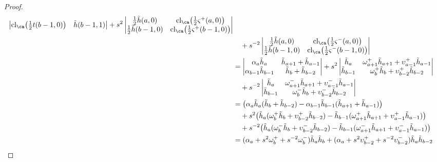 \begin{proof}
\begin{align*}
\begin{vmatrix}
\cl_\ca \big( \frac{1}{2} t(b-1,0) \big) & \tilde{h}(b-1,1)
\end{vmatrix}
+ s^2
\begin{vmatrix}
\frac{1}{2}\tilde{h}(a,0) & \cl_\ca \big( \frac{1}{2} \varsigma^+(a,0) \big) \\
\frac{1}{2}\tilde{h}(b-1,0) & \cl_\ca \big( \frac{1}{2} \varsigma^+(b-1,0) \big)
\end{vmatrix} \\
& \quad + s^{-2}
\begin{vmatrix}
\frac{1}{2}\tilde{h}(a,0) & \cl_\ca \big( \frac{1}{2} \varsigma^-(a,0) \big) \\
\frac{1}{2}\tilde{h}(b-1,0) & \cl_\ca \big( \frac{1}{2} \varsigma^-(b-1,0) \big)
\end{vmatrix} \\
&=
\begin{vmatrix}
\alpha_a \tilde{h}_a & \tilde{h}_{a+1} + \tilde{h}_{a-1} \\
\alpha_{b-1} \tilde{h}_{b-1} & \tilde{h}_{b} + \tilde{h}_{b-2}
\end{vmatrix}
+ s^2
\begin{vmatrix}
\tilde{h}_a & \omega_{a+1}^+ \tilde{h}_{a+1} + \upsilon^+_{a-1} \tilde{h}_{a-1} \\
\tilde{h}_{b-1} & \omega_{b}^+ \tilde{h}_{b} + \upsilon^+_{b-2} \tilde{h}_{b-2}
\end{vmatrix} \\
& \quad + s^{-2}
\begin{vmatrix}
\tilde{h}_a & \omega_{a+1}^- \tilde{h}_{a+1} + \upsilon^-_{a-1} \tilde{h}_{a-1} \\
\tilde{h}_{b-1} & \omega_{b}^- \tilde{h}_{b} + \upsilon^-_{b-2} \tilde{h}_{b-2}
\end{vmatrix} \\
&= \big( \alpha_a \tilde{h}_a (\tilde{h}_{b} + \tilde{h}_{b-2}) - \alpha_{b-1} \tilde{h}_{b-1} (\tilde{h}_{a+1} + \tilde{h}_{a-1}) \big) \\
& \quad + s^2 \big( \tilde{h}_a (\omega_{b}^+ \tilde{h}_{b} + \upsilon^+_{b-2} \tilde{h}_{b-2}) - \tilde{h}_{b-1}( \omega_{a+1}^+\tilde{h}_{a+1} + \upsilon^+_{a-1} \tilde{h}_{a-1}) \big) \\
& \quad + s^{-2} \big( \tilde{h}_a (\omega_{b}^- \tilde{h}_{b} + \upsilon^-_{b-2} \tilde{h}_{b-2}) - \tilde{h}_{b-1} (\omega_{a+1}^- \tilde{h}_{a+1} + \upsilon^-_{a-1} \tilde{h}_{a-1}) \big) \\
&= (\alpha_a + s^2 \omega_b^+ + s^{-2} \omega_b^-) \tilde{h}_a \tilde{h}_b + (\alpha_a + s^2 \upsilon_{b-2}^+ + s^{-2} \upsilon_{b-2}^-) \tilde{h}_a \tilde{h}_{b-2} \\

\end{align*}
\end{proof}
